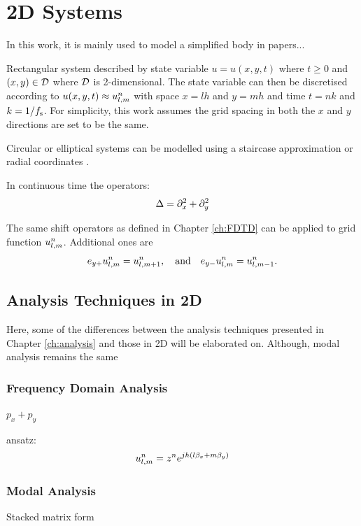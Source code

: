 \chapter{2D Systems}\label{ch:2Dsyst}



In this work, it is mainly used to model a simplified body in papers...


Rectangular system described by state variable $u = u(x,y,t)$  where $t\geq 0$ and $(x,y) \in \mathcal{D}$ where $\mathcal{D}$ is 2-dimensional. The state variable can then be discretised according to $u(x, y, t) \approx u_{l,m}^n$ with space $x = lh$ and $y = mh$ and time $t = nk$ and $k=1/f_\text{s}$. For simplicity, this work assumes the grid spacing in both the $x$ and $y$ directions are set to be the same.

Circular or elliptical systems can be modelled using a staircase approximation or radial coordinates \cite{theBible}. 

In continuous time the  operators:
\begin{equation}\label{eq:laplacian}
    \Delta = \partial_x^2 + \partial_y^2
\end{equation}


The same shift operators as defined in Chapter \ref{ch:FDTD} can be applied to grid function $u_{l,m}^n$. Additional ones are
\begin{equation}
    e_{y+}u_{l,m}^n = u_{l, m+1}^n,\quad \text{and}\quad e_{y-}u_{l,m}^n= u_{l, m-1}^n.
\end{equation}

\section{Analysis Techniques in 2D}\label{sec:analysis2D}
Here, some of the differences between the analysis techniques presented in Chapter \ref{ch:analysis} and those in 2D will be elaborated on. Although, modal analysis remains the same

\subsection{Frequency Domain Analysis}
$p_x + p_y$

ansatz:
\begin{equation}
    u_{l,m}^n = z^n e^{jh(l\beta_x + m\beta_y)}
\end{equation}


\subsection{Modal Analysis}
Stacked matrix form

